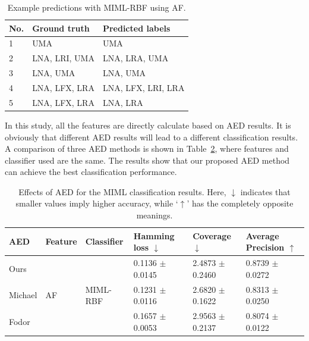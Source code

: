 \begin{table}[htb!]
\centering
\caption{Example predictions with MIML-RBF using AF.}
\label{tab:prediction}
\begin{tabular}{lll}
\hline\hline
{\bf No.} &{\bf Ground truth} & {\bf Predicted labels} \\ \hline
1&UMA                & UMA                    \\ 
2&LNA, LRI, UMA      & LNA, LRA, UMA          \\ 
3&LNA, UMA           & LNA, UMA               \\ 
4&LNA, LFX, LRA      & LNA, LFX, LRI, LRA     \\ 
5&LNA, LFX, LRA      & LNA, LRA               \\ \hline\hline
\end{tabular}
\end{table}


In this study, all the features are directly calculate based on AED results.
It is obviously that different AED results will lead to a different classification results. 
A comparison of three AED methods is shown in Table~\ref{Ch6:AEDCompare}, where features and classifier used are the same. The results show that our proposed AED method can achieve the best classification performance.


\begin{table}[htb!]
\centering
\caption{Effects of AED for the MIML classification results. Here, $\downarrow$ indicates that smaller values imply higher accuracy, while ‘$\uparrow$’ has the completely opposite meanings.}
\label{Ch6:AEDCompare}
\begin{tabular}{llllll}
\hline\hline
AED     & Feature & Classifier & Hamming loss $\downarrow$ & Coverage $\downarrow$     & Average Precision  $\uparrow$\\ \hline
Ours    &       &    & 0.1136 $\pm$ 0.0145 & 2.4873 $\pm$ 0.2460 & 0.8739 $\pm$ 0.0272     \\ 
Michael & AF      & MIML-RBF   & 0.1231 $\pm$ 0.0116 & 2.6820 $\pm$ 0.1622 & 0.8313 $\pm$ 0.0250     \\ 
Fodor   &       &   & 0.1657 $\pm$ 0.0053 & 2.9563 $\pm$ 0.2137 & 0.8074 $\pm$ 0.0122     \\ \hline\hline
\end{tabular}
\end{table}


